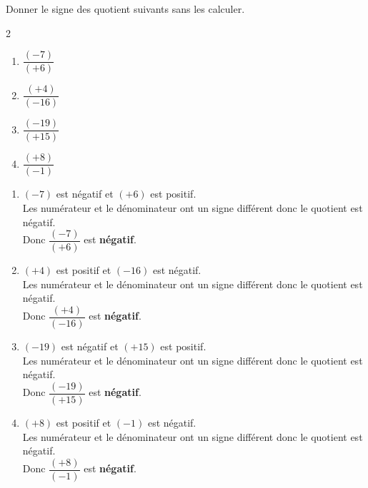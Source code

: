\begin{exercice*}
    Donner le signe des quotient suivants sans les calculer.
    \begin{multicols}2
        \begin{spacing}{2}
            \begin{enumerate}
                \item $ \dfrac{(-7)}{(+6)} $            
                \item $ \dfrac{(+4)}{(-16)} $            
                \item $ \dfrac{(-19)}{(+15)} $
                \item $ \dfrac{(+8)}{(-1)} $            
            \end{enumerate}
        \end{spacing}
    \end{multicols}
\end{exercice*}
\begin{corrige}
        \begin{enumerate}
            \item $ (-7) $ est négatif et $ (+6) $ est positif.\\
            Les numérateur et le dénominateur ont un signe différent donc le quotient est négatif.\\
           Donc $ \dfrac{(-7)}{(+6)} $ est {\bfseries \color[HTML]{f15929}négatif}.
               \item $ (+4) $ est positif et $ (-16) $ est négatif.\\
            Les numérateur et le dénominateur ont un signe différent donc le quotient est négatif.\\
           Donc $ \dfrac{(+4)}{(-16)} $ est {\bfseries \color[HTML]{f15929}négatif}.
               \item $ (-19) $ est négatif et $ (+15) $ est positif.\\
            Les numérateur et le dénominateur ont un signe différent donc le quotient est négatif.\\
           Donc $ \dfrac{(-19)}{(+15)} $ est {\bfseries \color[HTML]{f15929}négatif}.
               \item $ (+8) $ est positif et $ (-1) $ est négatif.\\
            Les numérateur et le dénominateur ont un signe différent donc le quotient est négatif.\\
           Donc $ \dfrac{(+8)}{(-1)} $ est {\bfseries \color[HTML]{f15929}négatif}.
        \end{enumerate}
\end{corrige}

